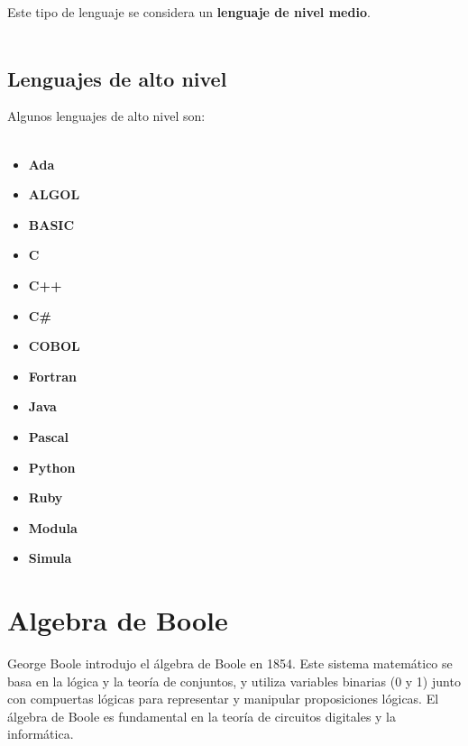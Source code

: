 \documentclass{templateNote}
\begin{document}
\vspace{1cm} %

\noindent Este tipo de lenguaje se considera un \textbf{lenguaje de nivel medio}.\\\\

\subsection{Lenguajes de alto nivel}
\noindent Algunos lenguajes de alto nivel son: \\\\
\begin{minipage}{0.33\textwidth}
\begin{itemize}
    \item \textbf{Ada}
    \item \textbf{ALGOL}
    \item \textbf{BASIC}
    \item \textbf{C}
    \item \textbf{C++}
\end{itemize}
\end{minipage}
\begin{minipage}{0.33\textwidth}
\begin{itemize}
    \item \textbf{C\#}
    \item \textbf{COBOL}
    \item \textbf{Fortran}
    \item \textbf{Java}
    \item \textbf{Pascal}
\end{itemize}
\end{minipage}
\begin{minipage}{0.33\textwidth}
\begin{itemize}
    \item \textbf{Python}
    \item \textbf{Ruby}
    \item \textbf{Modula}
    \item \textbf{Simula}
\end{itemize}
\end{minipage}
\newpage

\section{Algebra de Boole}
\noindent George Boole introdujo el álgebra de Boole en 1854. Este sistema matemático se basa en la lógica y la teoría de conjuntos, y utiliza variables binarias (0 y 1) junto con compuertas lógicas para representar y manipular proposiciones lógicas. El álgebra de Boole es fundamental en la teoría de circuitos digitales y la informática.
\end{document}
